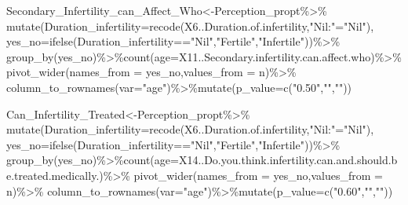 \documentclass[
]{article}
\newenvironment{Shaded}{\begin{snugshade}}{\end{snugshade}}
\newcommand{\AttributeTok}[1]{\textcolor[rgb]{0.77,0.63,0.00}{#1}}
\newcommand{\FunctionTok}[1]{\textcolor[rgb]{0.00,0.00,0.00}{#1}}
\newcommand{\NormalTok}[1]{#1}
\newcommand{\OtherTok}[1]{\textcolor[rgb]{0.56,0.35,0.01}{#1}}
\newcommand{\SpecialCharTok}[1]{\textcolor[rgb]{0.00,0.00,0.00}{#1}}
\newcommand{\StringTok}[1]{\textcolor[rgb]{0.31,0.60,0.02}{#1}}
\begin{document}
\begin{Shaded}
\begin{Highlighting}[]
\NormalTok{Secondary\_Infertility\_can\_Affect\_Who}\OtherTok{\textless{}{-}}\NormalTok{Perception\_propt}\SpecialCharTok{\%\textgreater{}\%}
  \FunctionTok{mutate}\NormalTok{(}\AttributeTok{Duration\_infertility=}\FunctionTok{recode}\NormalTok{(X6..Duration.of.infertility,}\StringTok{"Nil:"}\OtherTok{=}\StringTok{"Nil"}\NormalTok{),}
 \AttributeTok{yes\_no=}\FunctionTok{ifelse}\NormalTok{(Duration\_infertility}\SpecialCharTok{==}\StringTok{"Nil"}\NormalTok{,}\StringTok{"Fertile"}\NormalTok{,}\StringTok{"Infertile"}\NormalTok{))}\SpecialCharTok{\%\textgreater{}\%}
  \FunctionTok{group\_by}\NormalTok{(yes\_no)}\SpecialCharTok{\%\textgreater{}\%}\FunctionTok{count}\NormalTok{(}\AttributeTok{age=}\NormalTok{X11..Secondary.infertility.can.affect.who)}\SpecialCharTok{\%\textgreater{}\%}
  \FunctionTok{pivot\_wider}\NormalTok{(}\AttributeTok{names\_from =}\NormalTok{ yes\_no,}\AttributeTok{values\_from =}\NormalTok{ n)}\SpecialCharTok{\%\textgreater{}\%}
  \FunctionTok{column\_to\_rownames}\NormalTok{(}\AttributeTok{var=}\StringTok{"age"}\NormalTok{)}\SpecialCharTok{\%\textgreater{}\%}\FunctionTok{mutate}\NormalTok{(}\AttributeTok{p\_value=}\FunctionTok{c}\NormalTok{(}\StringTok{"0.50"}\NormalTok{,}\StringTok{""}\NormalTok{,}\StringTok{""}\NormalTok{))}


\NormalTok{Can\_Infertility\_Treated}\OtherTok{\textless{}{-}}\NormalTok{Perception\_propt}\SpecialCharTok{\%\textgreater{}\%}
  \FunctionTok{mutate}\NormalTok{(}\AttributeTok{Duration\_infertility=}\FunctionTok{recode}\NormalTok{(X6..Duration.of.infertility,}\StringTok{"Nil:"}\OtherTok{=}\StringTok{"Nil"}\NormalTok{),}
         \AttributeTok{yes\_no=}\FunctionTok{ifelse}\NormalTok{(Duration\_infertility}\SpecialCharTok{==}\StringTok{"Nil"}\NormalTok{,}\StringTok{"Fertile"}\NormalTok{,}\StringTok{"Infertile"}\NormalTok{))}\SpecialCharTok{\%\textgreater{}\%}
  \FunctionTok{group\_by}\NormalTok{(yes\_no)}\SpecialCharTok{\%\textgreater{}\%}\FunctionTok{count}\NormalTok{(}\AttributeTok{age=}\NormalTok{X14..Do.you.think.infertility.can.and.should.be.treated.medically.)}\SpecialCharTok{\%\textgreater{}\%}
  \FunctionTok{pivot\_wider}\NormalTok{(}\AttributeTok{names\_from =}\NormalTok{ yes\_no,}\AttributeTok{values\_from =}\NormalTok{ n)}\SpecialCharTok{\%\textgreater{}\%}
  \FunctionTok{column\_to\_rownames}\NormalTok{(}\AttributeTok{var=}\StringTok{"age"}\NormalTok{)}\SpecialCharTok{\%\textgreater{}\%}\FunctionTok{mutate}\NormalTok{(}\AttributeTok{p\_value=}\FunctionTok{c}\NormalTok{(}\StringTok{"0.60"}\NormalTok{,}\StringTok{""}\NormalTok{,}\StringTok{""}\NormalTok{))}


\end{Highlighting}
\end{Shaded}
\end{document}
